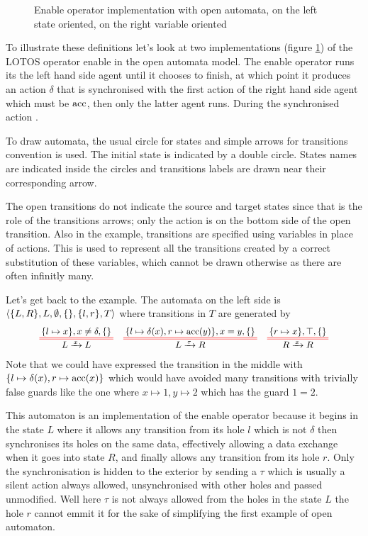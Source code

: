 \documentclass{article}
\begin{document}
\begin{figure}
\centering

\vrule

\caption{Enable operator implementation with open automata, on the left state oriented, on the right variable oriented}
\label{fig:enable}
\end{figure}
To illustrate these definitions let's look at two implementations (figure \ref{fig:enable}) of the LOTOS operator enable in the open automata model.
The enable operator runs its the left hand side agent until it chooses to finish, at which point it produces an action \(\delta\) that is synchronised with the first action of the right hand side agent which must be \(\mathrm{acc}\), then only the latter agent runs.
During the synchronised action .
\begin{exi}
To draw automata, the usual circle for states and simple arrows for transitions convention is used.
The initial state is indicated by a double circle.
States names are indicated inside the circles and transitions labels are drawn near their corresponding arrow.

The open transitions do not indicate the source and target states since that is the role of the transitions arrows; only the action is on the bottom side of the open transition.
Also in the example, transitions are specified using variables in place of actions.
This is used to represent all the transitions created by a correct substitution of these variables, which cannot be drawn otherwise as there are often infinitly many.

Let's get back to the example.
The automata on the left side is \(\left<{\left\{L, R\right\}},L,\emptyset,{\left\{\right\}},{\left\{l, r\right\}},T\right>\) where transitions in \(T\) are generated by
\begin{align*}
	\OT{L}{L}{x}{\mbrc{l \mapsto x}}{x \neq \delta}{\mbrc{}} &&
	\OT{L}{R}{\tau}{\mbrc{l \mapsto \delta\mpar{x}, r \mapsto \act{acc}\mpar{y}}}{x = y}{\mbrc{}} &&
	\OT{R}{R}{x}{\mbrc{r \mapsto x}}{\top}{\mbrc{}}
\end{align*}
Note that we could have expressed the transition in the middle with \({\left\{l \mapsto \delta{\left(x\right)}, r \mapsto \mathrm{acc}{\left(x\right)}\right\}}\) which would have avoided many transitions with trivially false guards like the one where \(x \mapsto 1, y \mapsto 2\) which has the guard \(1 = 2\).

This automaton is an implementation of the enable operator because it begins in the state \(L\) where it allows any transition from its hole \(l\) which is not \(\delta\) then synchronises its holes on the same data, effectively allowing a data exchange when it goes into state \(R\), and finally allows any transition from its hole \(r\).
Only the synchronisation is hidden to the exterior by sending a \(\tau\) which is usually a silent action always allowed, unsynchronised with other holes and passed unmodified.
Well here \(\tau\) is not always allowed from the holes in the state \(L\) the hole \(r\) cannot emmit it for the sake of simplifying the first example of open automaton.
\end{exi}
\end{document}
